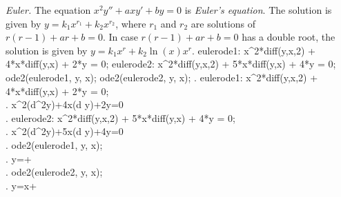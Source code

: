 \noindent
\textit{Euler.}\quad
The equation $x^2y'' + axy' + by=0$ is \textit{Euler's equation}.  
The solution is given by $y=k_1x^{r_1} + k_2x^{r_2}$, where $r_1$ and
$r_2$ are solutions of $r(r-1) + ar + b=0$.
In case $r(r-1) + ar + b=0$ has a double root,
the solution is given by $y=k_1x^{r} + k_2\ln(x)x^{r}$.
\beginmaximasession
eulerode1: x^2*diff(y,x,2) + 4*x*diff(y,x) + 2*y = 0;
eulerode2: x^2*diff(y,x,2) + 5*x*diff(y,x) + 4*y = 0;
ode2(eulerode1, y, x);
ode2(eulerode2, y, x);
\maximatexsession
{}.  eulerode1: x^2*diff(y,x,2) + 4*x*diff(y,x) + 2*y = 0; \\
.   x^{2}\*\left({{d^{2}}}\*y\right)+4\*x\*\left({{d
 }}\*y\right)+2\*y=0 \\
.  eulerode2: x^2*diff(y,x,2) + 5*x*diff(y,x) + 4*y = 0; \\
.   x^{2}\*\left({{d^{2}}}\*y\right)+5\*x\*\left({{d
 }}\*y\right)+4\*y=0 \\
.  ode2(eulerode1, y, x); \\
.   y={{}}+{{}} \\
.  ode2(eulerode2, y, x); \\
.   y={{\*\log x+}} \\
\endmaximasession

\smallskip

